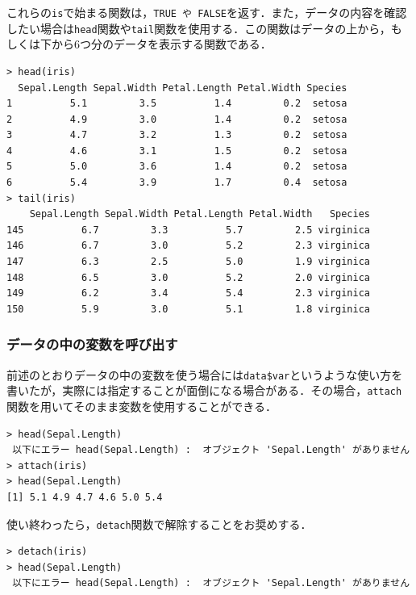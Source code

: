 これらの{\tt is}で始まる関数は，{\tt TRUE や FALSE}を返す．また，データの内容を確認したい場合は{\tt head}関数や{\tt tail}関数を使用する．この関数はデータの上から，もしくは下から6つ分のデータを表示する関数である．
\begin{breakbox}
\begin{verbatim}
> head(iris)
  Sepal.Length Sepal.Width Petal.Length Petal.Width Species
1          5.1         3.5          1.4         0.2  setosa
2          4.9         3.0          1.4         0.2  setosa
3          4.7         3.2          1.3         0.2  setosa
4          4.6         3.1          1.5         0.2  setosa
5          5.0         3.6          1.4         0.2  setosa
6          5.4         3.9          1.7         0.4  setosa
> tail(iris)
    Sepal.Length Sepal.Width Petal.Length Petal.Width   Species
145          6.7         3.3          5.7         2.5 virginica
146          6.7         3.0          5.2         2.3 virginica
147          6.3         2.5          5.0         1.9 virginica
148          6.5         3.0          5.2         2.0 virginica
149          6.2         3.4          5.4         2.3 virginica
150          5.9         3.0          5.1         1.8 virginica
\end{verbatim}
\end{breakbox}
\subsubsection{データの中の変数を呼び出す}
前述のとおりデータの中の変数を使う場合には\verb+data$var+というような使い方を書いたが，実際には指定することが面倒になる場合がある．その場合，{\tt attach}関数を用いてそのまま変数を使用することができる．
\begin{breakbox}
\begin{verbatim}
> head(Sepal.Length)
 以下にエラー head(Sepal.Length) :  オブジェクト 'Sepal.Length' がありません 
> attach(iris)
> head(Sepal.Length)
[1] 5.1 4.9 4.7 4.6 5.0 5.4
\end{verbatim}
\end{breakbox}
使い終わったら，{\tt detach}関数で解除することをお奨めする．
\begin{breakbox}
\begin{verbatim}
> detach(iris)
> head(Sepal.Length)
 以下にエラー head(Sepal.Length) :  オブジェクト 'Sepal.Length' がありません 
\end{verbatim}
\end{breakbox}
